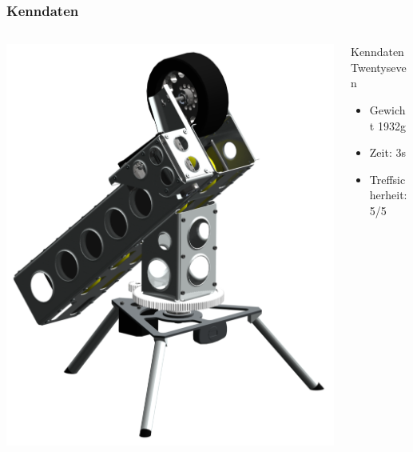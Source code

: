 \begin{frame}
    \frametitle{Kenndaten}
    \begin{columns}
        \begin{column}{0.50\textwidth}
            \centering
            \includegraphics[width=1.00\textwidth]{../doc/fig/Bild_mit_Kamera.png}
        \end{column}
        \begin{column}{0.50\textwidth}
            \begin{block}{Kenndaten Twentyseven}
                \begin{itemize}
                    \item Gewicht 1932\si{\gram}
                    \item Zeit: 3\si{\second}
                    \item Treffsicherheit: 5/5
                \end{itemize}
            \end{block}
        \end{column}
    \end{columns}
\end{frame}
